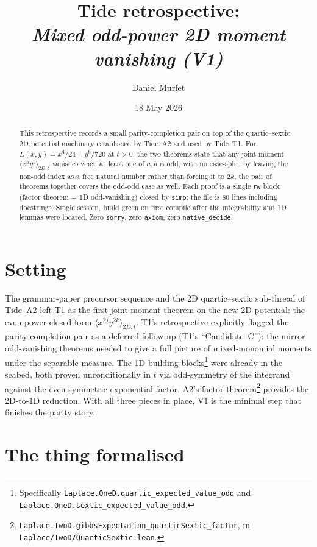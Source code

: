 \documentclass[11pt]{article}
\title{Tide retrospective:\\\emph{Mixed odd-power 2D moment vanishing (V1)}}
\author{Daniel Murfet}
\date{18 May 2026}
\begin{document}
\maketitle

\begin{abstract}
This retrospective records a small parity-completion pair on top of
the quartic--sextic 2D potential machinery established by Tide~A2
and used by Tide~T1. For $L(x, y) = x^4/24 + y^6/720$ at $t > 0$,
the two theorems state that any joint moment
$\langle x^a y^b \rangle_{2D, t}$ vanishes when at least one of
$a, b$ is odd, with no case-split: by leaving the non-odd index as a
free natural number rather than forcing it to $2k$, the pair of
theorems together covers the odd-odd case as well. Each proof is a
single \texttt{rw} block (factor theorem + 1D odd-vanishing) closed
by \texttt{simp}; the file is 80 lines including docstrings. Single
session, build green on first compile after the integrability and
1D lemmas were located. Zero \texttt{sorry}, zero \texttt{axiom},
zero \texttt{native\_decide}.
\end{abstract}

\section{Setting}

The grammar-paper precursor sequence and the 2D quartic--sextic
sub-thread of Tide~A2 left T1 as the first joint-moment theorem on
the new 2D potential: the even-power closed form
$\langle x^{2j} y^{2k} \rangle_{2D, t}$. T1's retrospective
explicitly flagged the parity-completion pair as a deferred
follow-up (T1's ``Candidate~C''): the mirror odd-vanishing theorems
needed to give a full picture of mixed-monomial moments under the
separable measure. The 1D building blocks\footnote{Specifically
\texttt{Laplace.OneD.quartic\_expected\_value\_odd} and
\texttt{Laplace.OneD.sextic\_expected\_value\_odd}.} were already
in the seabed, both proven unconditionally in $t$ via odd-symmetry
of the integrand against the even-symmetric exponential factor.
A2's factor theorem\footnote{\texttt{Laplace.TwoD.gibbsExpectation\_quarticSextic\_factor},
in \texttt{Laplace/TwoD/QuarticSextic.lean}.} provides the
2D-to-1D reduction. With all three pieces in place, V1 is the
minimal step that finishes the parity story.

\section{The thing formalised}
\end{document}
